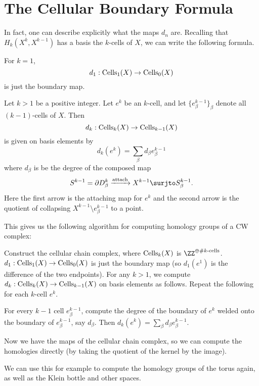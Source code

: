 \section{The Cellular Boundary Formula}
In fact, one can describe explicitly what the maps $d_n$ are.
Recalling that $H_k(X^k, X^{k-1})$ has a basis the $k$-cells of $X$, we
can write the following formula.
\begin{theorem}
	[Cellular Boundary Formula for $k=1$]
	For $k=1$, \[ d_1 : \operatorname{Cells}_1(X) \to \operatorname{Cells}_0(X) \] is just the boundary map.
\end{theorem}
\begin{theorem}
	Let $k > 1$ be a positive integer.
	Let $e^k$ be an $k$-cell, and let $\{e_\beta^{k-1}\}_\beta$
	denote all $(k-1)$-cells of $X$.
	Then \[ d_k : \operatorname{Cells}_k(X) \to \operatorname{Cells}_{k-1}(X) \]
	is given on basis elements by
	\[ d_k(e^k) = \sum_\beta d_\beta e_\beta^{k-1} \]
	where $d_\beta$ is be the degree of the composed map
	\[ S^{k-1} = \partial D_\beta^k \xrightarrow{\text{attach}}
		X^{k-1} \surjto S_\beta^{k-1}. \]
	Here the first arrow is the attaching map for $e^k$
	and the second arrow is the quotient of collapsing
	$X^{k-1} \setminus e^{k-1}_\beta$ to a point.
\end{theorem}
This gives us the following algorithm for computing
homology groups of a CW complex:
\begin{itemize}
	\ii Construct the cellular chain complex,
	where $\operatorname{Cells}_k(X)$ is $\ZZ^{\oplus \# \text{$k$-cells}}$.
	\ii $d_1 : \operatorname{Cells}_1(X) \to \operatorname{Cells}_0(X)$ is just the boundary map
	(so $d_1(e^1)$ is the difference of the two endpoints).
	\ii For any $k > 1$, we compute $d_k : \operatorname{Cells}_k(X) \to \operatorname{Cells}_{k-1}(X)$
	on basis elements as follows.
	Repeat the following for each $k$-cell $e^k$.
	\begin{itemize}
		\ii For every $k-1$ cell $e^{k-1}_\beta$,
		compute the degree of the boundary of $e^k$ welded onto 
		the boundary of $e^{k-1}_\beta$, say $d_\beta$.
		\ii Then $d_k(e^k) = \sum_\beta d_\beta e^{k-1}_\beta$.
	\end{itemize}
	\ii Now we have the maps of the cellular chain complex,
	so we can compute the homologies directly
	(by taking the quotient of the kernel by the image).
\end{itemize}

We can use this for example to compute the homology groups of the torus again,
as well as the Klein bottle and other spaces.

